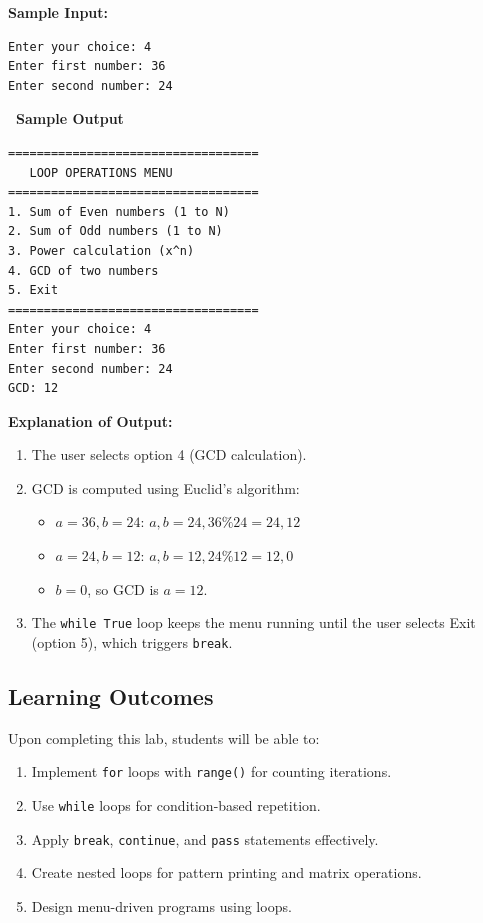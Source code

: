 \documentclass[12pt,a4paper]{article}
\newcommand{\outhead}{\noindent\colorbox{cmrgreen!25}%
  {\textbf{\small\color{cmrdark}~Sample Output~}}\par\vspace{-1pt}}
\begin{document}
\textbf{Sample Input:}
\begin{verbatim}
Enter your choice: 4
Enter first number: 36
Enter second number: 24
\end{verbatim}

\outhead
\begin{lstlisting}[style=outputstyle]
===================================
   LOOP OPERATIONS MENU
===================================
1. Sum of Even numbers (1 to N)
2. Sum of Odd numbers (1 to N)
3. Power calculation (x^n)
4. GCD of two numbers
5. Exit
===================================
Enter your choice: 4
Enter first number: 36
Enter second number: 24
GCD: 12
\end{lstlisting}

\textbf{Explanation of Output:}
\begin{enumerate}
  \item The user selects option 4 (GCD calculation).
  \item GCD is computed using Euclid's algorithm:
    \begin{itemize}
      \item $a=36, b=24$: $a, b = 24, 36\%24 = 24, 12$
      \item $a=24, b=12$: $a, b = 12, 24\%12 = 12, 0$
      \item $b=0$, so GCD is $a = 12$.
    \end{itemize}
  \item The \texttt{while True} loop keeps the menu running until the user selects Exit (option 5), which triggers \texttt{break}.
\end{enumerate}

\subsection{Learning Outcomes}
Upon completing this lab, students will be able to:
\begin{enumerate}
  \item Implement \texttt{for} loops with \texttt{range()} for counting iterations.
  \item Use \texttt{while} loops for condition-based repetition.
  \item Apply \texttt{break}, \texttt{continue}, and \texttt{pass} statements effectively.
  \item Create nested loops for pattern printing and matrix operations.
  \item Design menu-driven programs using loops.
\end{enumerate}
\end{document}
